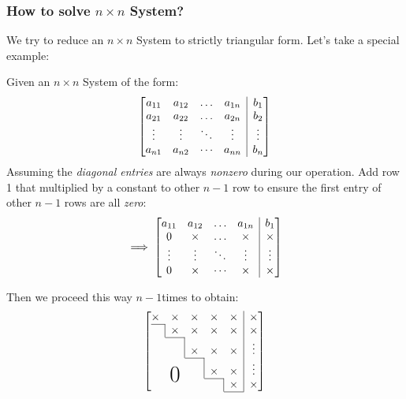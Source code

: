 \subsubsection{How to solve $n \times n$ System?}
We try to reduce an $n \times n$ System to strictly triangular form. Let's take a special example:
\begin{example}
Given an $n \times n$ System of the form:
\begin{equation}\left[
\begin{array}{@{}cccc|c@{}}
a_{11} & a_{12} & \dots & a_{1n} &  b_1 \\
a_{21} & a_{22} & \dots & a_{2n} &  b_2 \\
\vdots    & \vdots    & \ddots & \vdots    & \vdots \\
a_{n1} & a_{n2} & \cdots & a_{nn} &   b_n
\end{array}\right]\label{eq:n*n_matrix}\end{equation}
Assuming the \emph{diagonal entries} are always \textit{nonzero} during our operation. 
Add row 1 that multiplied by a constant to other $n-1$ row to ensure the first entry of other $n-1$ rows are all \textit{zero}:
\begin{equation}
\implies 
\left[
\begin{array}{@{}cccc|c@{}}
a_{11} & a_{12} & \dots & a_{1n} &  b_1 \\
0 & \x & \dots & \x &  \x \\
\vdots    & \vdots    & \ddots & \vdots    & \vdots \\
0 & \x & \cdots & \x &   \x
\end{array}
\right] \label{eq:n*n_matrix_version1}\end{equation}


Then we proceed this way $n-1$times to obtain:
\begin{equation}
  \left[
    \begin{array}{@{}ccccc|c@{}}
    \x    & \x       & \x    & \x    & \x & \x\\ \cline{1-1}
    \bord & \x       & \x    & \x    & \x & \x\\ \cline{2-2}
          & \bord    & \x    & \x    & \x & \vdots \\ \cline{3-3}
          & \bigzero & \bord & \x    & \x & \vdots \\ \cline{4-4}
          &          &       & \bord & \x & \x \\ \cline{5-5}
  \end{array}\right]\label{eq:n*n_matrix_version2}
\end{equation}


\end{example}
